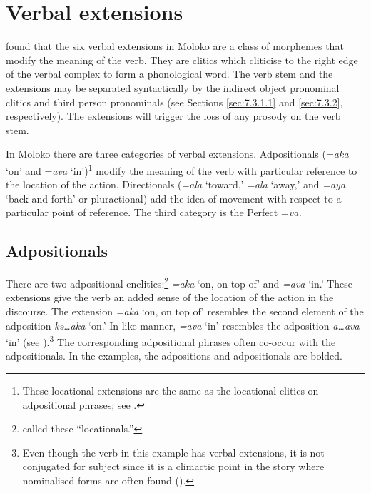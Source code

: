 \section{Verbal extensions}\label{sec:7.5}
\hypertarget{RefHeading1212321525720847}{}
\citet{FriesenMamalis2008} found that the six verbal extensions in Moloko are a class of morphemes that modify the meaning of the verb. They are clitics which cliticise to the right edge of the verbal complex to form a phonological word.  The verb stem and the extensions may be separated syntactically by the indirect object pronominal clitics and third person \DO pronominals (see Sections \ref{sec:7.3.1.1} and \ref{sec:7.3.2}, respectively).  The extensions will trigger the loss of any prosody on the verb stem.

In Moloko there are three categories of verbal extensions.  Adpositionals (=\textit{aka} ‘on’ and =\textit{ava} ‘in’)\footnote{These locational extensions are the same as the locational clitics on adpositional phrases; see .} modify the meaning of the verb with particular reference to the location of the action. Directionals (\textit{=ala} ‘toward,’ \textit{=ala } ‘away,’ and \textit{=aya } ‘back and forth’ or pluractional) add the idea of movement with respect to a particular point of reference. The third category is the Perfect =\textit{va.} 

\subsection{Adpositionals}\label{sec:7.5.1}
\hypertarget{RefHeading1212341525720847}{}
There are two adpositional enclitics:\footnote{\citet{FriesenMamalis2008} called these ``locationals.''} \textit{=aka} ‘on, on top of’ and \textit{=ava} ‘in.’  These extensions give the verb an added sense of the location of the action in the discourse.  The extension \textit{=aka} ‘on, on top of’  resembles the second element of the adposition \textit{kə…aka} ‘on.’  In like manner, \textit{=ava} ‘in’  resembles the adposition \textit{a…ava}  ‘in’ (see ).\footnote{Even though the verb in this example has verbal extensions, it is not conjugated for subject since it is a climactic point in the story where nominalised forms are often found ().} The corresponding adpositional phrases often co-occur with the adpositionals. In the examples, the adpositions and adpositionals are bolded. 

